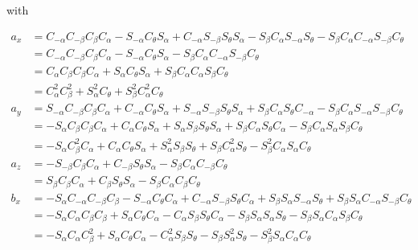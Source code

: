\documentclass[a4paper,11pt]{article}
\begin{document}
\begin {enumerate}
		with
		
		\begin{align*}
			a_x &= C_{-\alpha}C_{-\beta}C_{\beta}C_{\alpha} - S_{-\alpha}C_{\theta}S_{\alpha} + C_{-\alpha}S_{-\beta}S_{\theta}S_{\alpha} - S_{\beta}C_{\alpha}S_{-\alpha}S_{\theta} - S_{\beta}C_{\alpha}C_{-\alpha}S_{-\beta}C_{\theta}\\
			&= C_{-\alpha}C_{-\beta}C_{\beta}C_{\alpha} - S_{-\alpha}C_{\theta}S_{\alpha} - S_{\beta}C_{\alpha}C_{-\alpha}S_{-\beta}C_{\theta}\\
			&= C_{\alpha}C_{\beta}C_{\beta}C_{\alpha} + S_{\alpha}C_{\theta}S_{\alpha} + S_{\beta}C_{\alpha}C_{\alpha}S_{\beta}C_{\theta}\\
			&= C_{\alpha}^2C_{\beta}^2 + S_{\alpha}^2C_{\theta} + S_{\beta}^2C_{\alpha}^2C_{\theta}\\
			a_y &= S_{-\alpha}C_{-\beta}C_{\beta}C_{\alpha} + C_{-\alpha}C_{\theta}S_{\alpha} + S_{-\alpha}S_{-\beta}S_{\theta}S_{\alpha} + S_{\beta}C_{\alpha}S_{\theta}C_{-\alpha} - S_{\beta}C_{\alpha}S_{-\alpha}S_{-\beta}C_{\theta}\\
			&= -S_{\alpha}C_{\beta}C_{\beta}C_{\alpha} + C_{\alpha}C_{\theta}S_{\alpha} + S_{\alpha}S_{\beta}S_{\theta}S_{\alpha} + S_{\beta}C_{\alpha}S_{\theta}C_{\alpha} - S_{\beta}C_{\alpha}S_{\alpha}S_{\beta}C_{\theta}\\
			&= -S_{\alpha}C_{\beta}^2C_{\alpha} + C_{\alpha}C_{\theta}S_{\alpha} + S_{\alpha}^2S_{\beta}S_{\theta} + S_{\beta}C_{\alpha}^2S_{\theta} - S_{\beta}^2C_{\alpha}S_{\alpha}C_{\theta}\\
			a_z &= -S_{-\beta}C_{\beta}C_{\alpha} + C_{-\beta}S_{\theta}S_{\alpha} - S_{\beta}C_{\alpha}C_{-\beta}C_{\theta}\\
			&= S_{\beta}C_{\beta}C_{\alpha} + C_{\beta}S_{\theta}S_{\alpha} - S_{\beta}C_{\alpha}C_{\beta}C_{\theta}\\
			b_x &= -S_{\alpha}C_{-\alpha}C_{-\beta}C_{\beta} - S_{-\alpha}C_{\theta}C_{\alpha} + C_{-\alpha}S_{-\beta}S_{\theta}C_{\alpha} + S_{\beta}S_{\alpha}S_{-\alpha}S_{\theta} + S_{\beta}S_{\alpha}C_{-\alpha}S_{-\beta}C_{\theta}\\
			&= -S_{\alpha}C_{\alpha}C_{\beta}C_{\beta} + S_{\alpha}C_{\theta}C_{\alpha} - C_{\alpha}S_{\beta}S_{\theta}C_{\alpha} - S_{\beta}S_{\alpha}S_{\alpha}S_{\theta} - S_{\beta}S_{\alpha}C_{\alpha}S_{\beta}C_{\theta}\\
			&= -S_{\alpha}C_{\alpha}C_{\beta}^2 + S_{\alpha}C_{\theta}C_{\alpha} - C_{\alpha}^2S_{\beta}S_{\theta} - S_{\beta}S_{\alpha}^2S_{\theta} - S_{\beta}^2S_{\alpha}C_{\alpha}C_{\theta}\\

\end{align*}
\end{enumerate}
\end{document}
